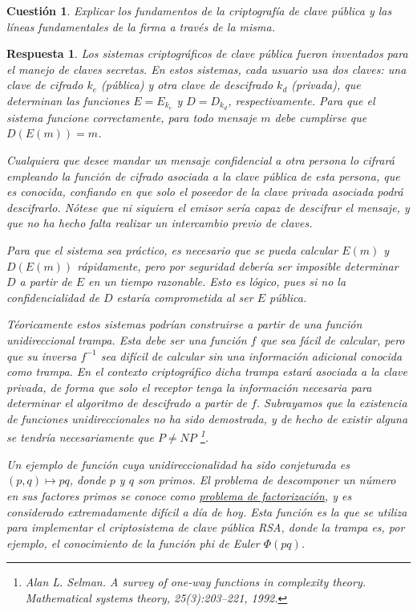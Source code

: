 \documentclass[
  a4paper,
  spanish,
  12pt,
]{scrartcl}
\theoremstyle{ejercicio-style}
\newtheorem{ejer}{Cuestión}
\theoremstyle{remark-style}
\newtheorem*{sol}{Respuesta}
\theoremstyle{teorema-style}
\begin{document}
\begin{ejer}
  Explicar los fundamentos de la criptografía de clave pública y las líneas fundamentales de la firma a través de la misma.
\end{ejer}
\begin{sol}

  Los sistemas criptográficos de clave pública fueron inventados para el manejo de claves secretas. En estos sistemas, cada usuario usa dos claves: una clave de cifrado $k_e$ (pública) y otra clave de descifrado $k_d$ (privada), que determinan las funciones $E = E_{k_e}$ y $D = D_{k_d}$, respectivamente. Para que el sistema funcione correctamente, para todo mensaje $m$ debe cumplirse que $D(E(m)) = m$.

  Cualquiera que desee mandar un mensaje confidencial a otra persona lo cifrará empleando la función de cifrado asociada a la clave pública de esta persona, que es conocida, confiando en que solo el poseedor de la clave privada asociada podrá descifrarlo. Nótese que ni siquiera el emisor sería capaz de descifrar el mensaje, y que no ha hecho falta realizar un intercambio previo de claves.

  Para que el sistema sea práctico, es necesario que se pueda calcular $E(m)$ y $D(E(m))$ rápidamente, pero por seguridad debería ser imposible determinar $D$ a partir de $E$ en un tiempo razonable. Esto es lógico, pues si no la confidencialidad de $D$ estaría comprometida al ser $E$ pública.

  Téoricamente estos sistemas podrían construirse a partir de una \textit{función unidireccional trampa}. Esta debe ser una función $f$ que sea \emph{fácil} de calcular, pero que su inversa $f^{-1}$ sea \emph{difícil} de calcular sin una información adicional conocida como \textit{trampa}. En el contexto criptográfico dicha trampa estará asociada a la clave privada, de forma que solo el receptor tenga la información necesaria para determinar el algoritmo de descifrado a partir de $f$. Subrayamos que la existencia de funciones unidireccionales no ha sido demostrada, y de hecho de existir alguna se tendría necesariamente que $P \neq NP$ \footnote{Alan L. Selman. \textit{A survey of one-way functions in complexity theory}. Mathematical systems theory, 25(3):203–221, 1992.}.

  Un ejemplo de función cuya unidireccionalidad ha sido conjeturada es $(p, q) \mapsto pq$, donde $p$ y $q$ son primos. El problema de descomponer un número en sus factores primos se conoce como \href{https://en.wikipedia.org/wiki/Integer_factorization}{problema de factorización}, y es considerado extremadamente difícil a día de hoy. Esta función es la que se utiliza para implementar el criptosistema de clave pública RSA, donde la trampa es, por ejemplo, el conocimiento de la \textit{función phi de Euler} $\Phi(pq)$.


\end{sol}
\end{document}

